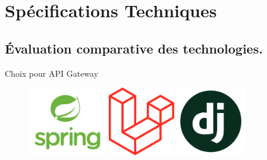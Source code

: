 \section{Spécifications Techniques}


\subsection{Évaluation comparative des technologies.}
\begin{frame}{Choix pour API Gateway}
    \begin{figure}[H]
        \centering
        \begin{minipage}{0.32\textwidth}
            \centering
            \includegraphics[height=3cm]{assets/images/spring.png}
        \end{minipage}%
        \hspace{0.03\textwidth}
        \begin{minipage}{0.32\textwidth}
            \centering
            \includegraphics[height=3cm]{assets/images/laravel.png}
        \end{minipage}%
        \hspace{0.03\textwidth}
        \begin{minipage}{0.32\textwidth}
            \centering
            \includegraphics[height=3cm]{assets/images/django.png}
        \end{minipage}
    \end{figure}
\end{frame}
